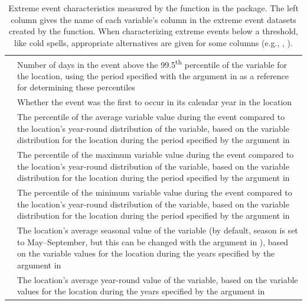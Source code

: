 \begin{table}
\begin{tabular}{lL{\tabcolsep\relax}}
 & Number of days in the event above the 99.5\textsuperscript{th} percentile of the variable for the location, using the period specified with the  argument in  as a reference for determining these percentiles \\
 & Whether the event was the first to occur in its calendar year in the location \\
 & The percentile of the average variable value during the event compared to the location's year-round distribution of the variable, based on the variable distribution for the location during the period specified by the  argument in  \\
 & The percentile of the maximum variable value during the event compared to the location's year-round distribution of the variable, based on the variable distribution for the location during the period specified by the  argument in  \\
 & The percentile of the minimum variable value during the event compared to the location's year-round distribution of the variable, based on the variable distribution for the location during the period specified by the  argument in  \\
 & The location's average seasonal value of the variable (by default, season is set to May--September, but this can be changed with the  argument in ), based on the variable values for the location during the years specified by the  argument in  \\
 & The location's average year-round value of the variable, based on the variable values for the location during the years specified by the  argument in  \\
\bottomrule
\end{tabular}
\caption{Extreme event characteristics measured by the  function in the  package. The left column gives the name of each variable's column in the extreme event datasets created by the  function. When characterizing extreme events below a threshold, like cold spells, appropriate alternatives are given for some columns (e.g., , ).}
\label{tab:hwcharacteristics}
\end{table}

